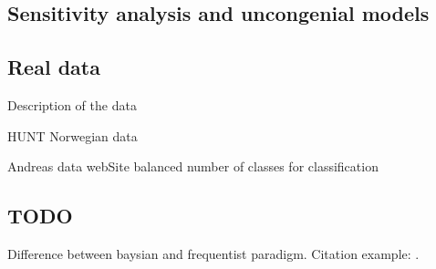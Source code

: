 \documentclass{article}
\begin{document}
	
	\subsection{Sensitivity analysis and uncongenial models}
	
	\subsection{Real data}
	
	Description of the data
	
	HUNT Norwegian data
	
	Andreas data webSite
	balanced number of classes for classification
	
	
	\subsection{TODO}
	Difference between baysian and frequentist paradigm.
	Citation example:
	\cite[P.10]{grund_pooling_2016}.

		
	
	
\end{document}
